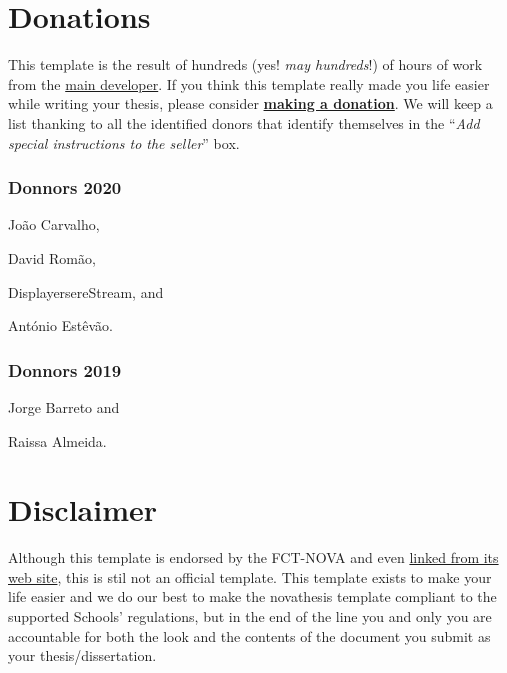 \section{Donations}
\label{sec:donations}

This template is the result of hundreds (yes! \emph{may hundreds}!) of hours of work from the \href{https://docentes.fct.unl.pt/joao-lourenco}{main developer}.  If you think this template really made you life easier while writing your thesis, please consider \href{https://paypal.me/novathesis}{\textbf{making a donation}}. We will keep a list thanking to all the identified donors that identify themselves in the “\emph{Add special instructions to the seller}” box.

\subsubsection*{Donnors 2020}
\label{ssub:donnors_2020}

\begin{inparaitem}[]
  \item João Carvalho, 
  \item David Romão, 
  \item DisplayersereStream, and
  \item António Estêvão.  
\end{inparaitem}

\subsubsection*{Donnors 2019}
\label{ssub:donnors_2019}

\begin{inparaitem}[]
  \item Jorge Barreto and
  \item Raissa Almeida.  
\end{inparaitem}



\section{Disclaimer}
\label{sec:disclaimer}

Although this template is endorsed by the FCT-NOVA and even \href{https://www.fct.unl.pt/estudante/informacao-academica}{linked from its web site}, this is stil not an official template.
%
This template exists to make your life easier and we do our best to make the \gls{novathesis} template compliant to the supported Schools' regulations, but in the end of the line you and only you are accountable for both the look and the contents of the document you submit as your thesis/dissertation.

